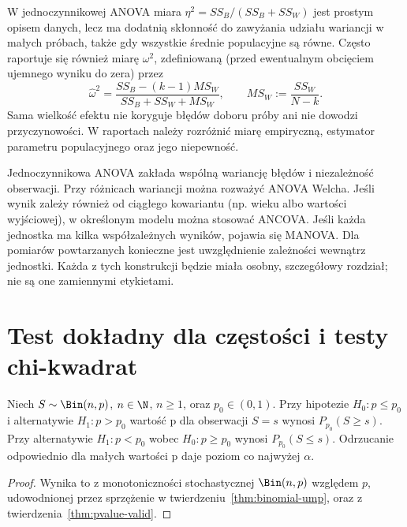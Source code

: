 \begin{uwaga}
W jednoczynnikowej ANOVA miara $\eta^2=SS_B/(SS_B+SS_W)$
jest prostym opisem danych, lecz ma dodatnią skłonność do
zawyżania udziału wariancji w małych próbach, także gdy
wszystkie średnie populacyjne są równe. Często raportuje się
również miarę $\omega^2$, zdefiniowaną (przed ewentualnym
obcięciem ujemnego wyniku do zera) przez
\[
 \widehat{\omega}^2=
 \frac{SS_B-(k-1)MS_W}{SS_B+SS_W+MS_W},\qquad
 MS_W:=\frac{SS_W}{N-k}.
\]
Sama wielkość efektu nie koryguje błędów doboru próby ani
nie dowodzi przyczynowości. W raportach należy rozróżnić
miarę empiryczną, estymator parametru populacyjnego oraz
jego niepewność.
\end{uwaga}

\begin{uwaga}
Jednoczynnikowa ANOVA zakłada wspólną wariancję błędów i
niezależność obserwacji. Przy różnicach wariancji można rozważyć
ANOVA Welcha. Jeśli wynik zależy również od ciągłego
kowariantu (np. wieku albo wartości wyjściowej), w określonym
modelu można stosować ANCOVA. Jeśli każda jednostka ma kilka
współzależnych wyników, pojawia się MANOVA. Dla pomiarów
powtarzanych konieczne jest uwzględnienie zależności
wewnątrz jednostki. Każda z tych konstrukcji będzie miała
osobny, szczegółowy rozdział; nie są one zamiennymi etykietami.
\end{uwaga}

\section{Test dokładny dla częstości i testy chi-kwadrat}
\begin{stwierdzenie}
Niech $S\sim\Bin(n,p)$, $n\in\N$, $n\ge1$, oraz
$p_0\in(0,1)$. Przy hipotezie $H_0:p\le p_0$ i
alternatywie $H_1:p>p_0$ wartość p dla obserwacji $S=s$
wynosi $P_{p_0}(S\ge s)$. Przy alternatywie
$H_1:p<p_0$ wobec $H_0:p\ge p_0$ wynosi
$P_{p_0}(S\le s)$. Odrzucanie odpowiednio dla małych
wartości p daje poziom co najwyżej $\alpha$.
\end{stwierdzenie}
\begin{proof}
Wynika to z monotoniczności stochastycznej
$\Bin(n,p)$ względem $p$, udowodnionej przez
sprzężenie w twierdzeniu~\ref{thm:binomial-ump}, oraz
z twierdzenia~\ref{thm:pvalue-valid}.
\end{proof}

